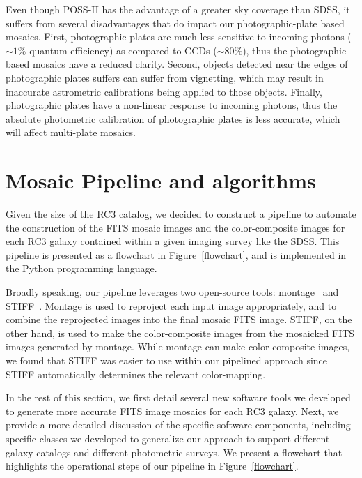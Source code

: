 \documentclass[authoryear, 12pt, 5p, times]{elsarticle}
\begin{document}
Even though POSS-II has the advantage of a greater sky coverage than SDSS, it suffers from several disadvantages that do impact our photographic-plate based mosaics. First, photographic plates are much less sensitive to incoming photons ($\sim1\%$ quantum efficiency) as compared to CCDs ($\sim80\%$), thus the photographic-based mosaics have a reduced clarity. Second, objects detected near the edges of photographic plates suffers can suffer from vignetting, which may result in inaccurate astrometric calibrations being applied to those objects. Finally, photographic plates have a non-linear response to incoming photons, thus the absolute photometric calibration of photographic plates is less accurate, which will affect multi-plate mosaics.

\section{Mosaic Pipeline and algorithms\label{mosaic-sec}}
Given the size of the RC3 catalog, we decided to construct a pipeline to automate the construction of the FITS mosaic images and the color-composite images for each RC3 galaxy contained within a given imaging survey like the SDSS. This pipeline is presented as a flowchart in Figure~\ref{flowchart}, and is implemented in the Python programming language.

Broadly speaking, our pipeline leverages two open-source tools: montage~\citep{montage} and  STIFF~\citep{stiff}. Montage is used to reproject each input image appropriately, and to combine the reprojected images into the final mosaic FITS image. STIFF, on the other hand, is used to make the color-composite images from the mosaicked FITS images generated by montage. While montage can make color-composite images, we found that STIFF was easier to use within our pipelined approach since STIFF automatically determines the relevant color-mapping.

In the rest of this section, we first detail several new software tools we developed to generate more accurate FITS image mosaics for each RC3 galaxy. Next, we provide a more detailed discussion of the specific software components, including specific classes we developed to generalize our approach to support different galaxy catalogs and different photometric surveys. We present a flowchart that highlights the operational steps of our pipeline in Figure~\ref{flowchart}.
\end{document}
